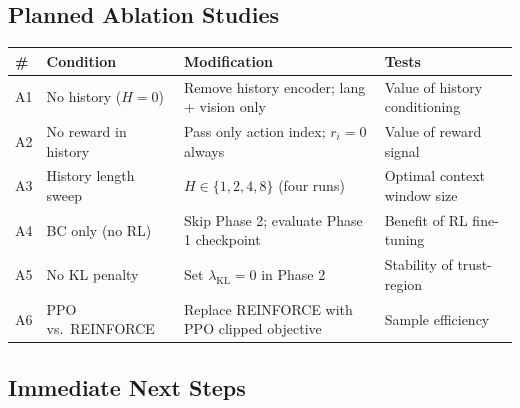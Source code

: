 \documentclass[11pt, a4paper]{article}
\renewcommand{\arraystretch}{1.18}
\begin{document}
\vspace{4pt}

\subsection*{Planned Ablation Studies}

\begin{center}
\footnotesize\renewcommand{\arraystretch}{1.16}
\begin{tabular}{C{0.5cm} L{4.0cm} L{5.2cm} L{4.9cm}}
\toprule
\textbf{\#} & \textbf{Condition} & \textbf{Modification} & \textbf{Tests} \\
\midrule
A1 & No history ($H{=}0$)   & Remove history encoder; lang + vision only        & Value of history conditioning \\
A2 & No reward in history    & Pass only action index; $r_i{=}0$ always          & Value of reward signal \\
A3 & History length sweep    & $H \in \{1, 2, 4, 8\}$ (four runs)               & Optimal context window size \\
A4 & BC only (no RL)         & Skip Phase 2; evaluate Phase 1 checkpoint         & Benefit of RL fine-tuning \\
A5 & No KL penalty           & Set $\lambda_{\mathrm{KL}}{=}0$ in Phase 2        & Stability of trust-region \\
A6 & PPO vs.\ REINFORCE      & Replace REINFORCE with PPO clipped objective      & Sample efficiency \\
\bottomrule
\end{tabular}
\end{center}

\vspace{4pt}

\subsection*{Immediate Next Steps}
\end{document}

